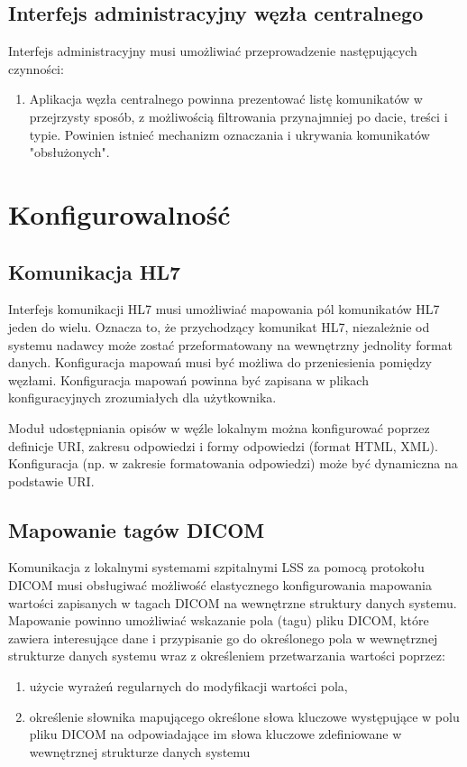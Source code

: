 \documentclass[a4paper]{report}
\begin{document}
\begin{enumerate}
\begin{enumerate}
\end{enumerate}

\subsection{Interfejs administracyjny węzła centralnego}

Interfejs administracyjny musi umożliwiać przeprowadzenie następujących czynności:
\begin{enumerate}
  \item Aplikacja węzła centralnego powinna prezentować listę komunikatów w przejrzysty sposób, z możliwością filtrowania przynajmniej po dacie, treści i typie. Powinien istnieć mechanizm oznaczania i ukrywania komunikatów "obsłużonych".
\end{enumerate}

\end{enumerate}

\section{Konfigurowalność}

\subsection{Komunikacja HL7}

Interfejs komunikacji HL7 musi umożliwiać mapowania pól komunikatów HL7 jeden do wielu. Oznacza to, że przychodzący komunikat HL7, niezależnie od systemu nadawcy może zostać przeformatowany na wewnętrzny jednolity format danych. Konfiguracja mapowań musi być możliwa do przeniesienia pomiędzy węzłami. Konfiguracja mapowań powinna być zapisana w plikach konfiguracyjnych zrozumiałych dla użytkownika.

Moduł udostępniania opisów w węźle lokalnym można konfigurować poprzez definicje URI, zakresu odpowiedzi i formy odpowiedzi (format HTML, XML). Konfiguracja (np. w zakresie formatowania odpowiedzi) może być dynamiczna na podstawie URI. 

\subsection{Mapowanie tagów DICOM}

Komunikacja z lokalnymi systemami szpitalnymi LSS za pomocą protokołu DICOM musi obsługiwać możliwość elastycznego konfigurowania mapowania wartości zapisanych w tagach DICOM na wewnętrzne struktury danych systemu. Mapowanie powinno umożliwiać wskazanie pola (tagu) pliku DICOM, które zawiera interesujące dane i przypisanie go do określonego pola w wewnętrznej strukturze danych systemu wraz z określeniem przetwarzania wartości poprzez:
\begin{enumerate}
  \item użycie wyrażeń regularnych do modyfikacji wartości pola,
  \item określenie słownika mapującego określone słowa kluczowe występujące w polu pliku DICOM na odpowiadające im słowa kluczowe zdefiniowane w wewnętrznej strukturze danych systemu
\end{enumerate}
\end{document}
